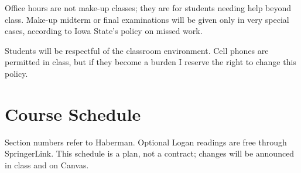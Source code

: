 \documentclass[11pt]{amsart}
\begin{document}
\begin{raggedright}
Office hours are not make-up classes; they are for
students needing help beyond class.  Make-up midterm or final examinations will be
given only in very special cases, according to Iowa State's policy on missed work.

\vspace{0.1in}

Students will be respectful of the classroom environment.  Cell phones are permitted in
class, but if they become a burden I reserve the right to change this policy.

\newpage

\section{Course Schedule}

Section numbers refer to Haberman.  Optional Logan readings are free through
SpringerLink.  This schedule is a plan, not a contract; changes will be announced in
class and on Canvas.

\vspace{0.1in}


\end{raggedright}
\end{document}
